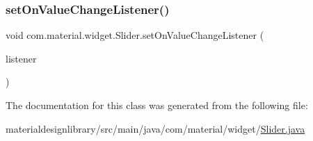 \mbox{\label{classcom_1_1material_1_1widget_1_1_slider_ab7618e0c7c7385bfc33cf65a75e6eb7c}} 
\subsubsection{\texorpdfstring{set\+On\+Value\+Change\+Listener()}{setOnValueChangeListener()}}
{\footnotesize\ttfamily void com.\+material.\+widget.\+Slider.\+set\+On\+Value\+Change\+Listener (\begin{DoxyParamCaption}\item[{On\+Value\+Change\+Listener}]{listener }\end{DoxyParamCaption})}



The documentation for this class was generated from the following file\+:\begin{DoxyCompactItemize}
\item 
materialdesignlibrary/src/main/java/com/material/widget/\hyperlink{_slider_8java}{Slider.\+java}\end{DoxyCompactItemize}
